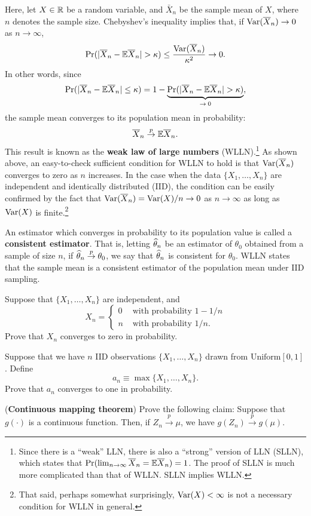 \documentclass[11pt, A4paper, openany, uplatex]{book}
\begin{document}
Here, let $X \in \mathbb{R}$ be a random variable, and $\bar X_n$ be the sample mean of $X$, where $n$ denotes the sample size.
Chebyshev's inequality implies that, if $\mathrm{Var}(\overline X_n) \to 0$ as $n \to \infty$,
\[
\Pr( |\overline X_n - \mathbb{E} \overline X_n | > \kappa ) \leq \frac{\mathrm{Var}(\overline X_n)}{\kappa^2} \to 0.
\]
In other words, since 
\[
	\Pr( |\overline X_n - \mathbb{E}\overline X_n | \le \kappa ) = 1 - \underbrace{\Pr( |\overline X_n - \mathbb{E}\overline X_n | > \kappa )}_{\to \: 0},
\]
the sample mean converges to its population mean in probability:
\[
\overline X_n \overset{p}{\to} \mathbb{E}\overline X_n.
\]
This result is known as the \textbf{weak law of large numbers} (WLLN).\footnote{	
	Since there is a ``weak'' LLN, there is also a ``strong'' version of LLN (SLLN), which states that $\Pr(\lim_{n \to \infty} \overline X_n = \mathbb{E} \overline X_n) = 1$.
	The proof of SLLN is much more complicated than that of WLLN.
	SLLN implies WLLN.}
As shown above, an easy-to-check sufficient condition for WLLN to hold is that $\mathrm{Var}(\overline X_n)$ converges to zero as $n$ increases.
In the case when the data $\{X_1, \ldots , X_n\}$ are independent and identically distributed (IID), the condition can be easily confirmed by the fact that $\mathrm{Var}(\overline X_n) = \mathrm{Var}(X)/n \to 0$ as $n \to \infty$ as long as $\mathrm{Var}(X)$ is finite.\footnote{
	That said, perhaps somewhat surprisingly, $\mathrm{Var}(X) < \infty$ is not a necessary condition for WLLN in general.
	}
\bigskip

An estimator which converges in probability to its population value is called a \textbf{consistent estimator}.
That is, letting $\widehat \theta_n$ be an estimator of $\theta_0$ obtained from a sample of size $n$, if $\widehat \theta_n \overset{p}{\to} \theta_0$, we say that $\widehat \theta_n$ is consistent for $\theta_0$.
WLLN states that the sample mean is a consistent estimator of the population mean under IID sampling.

\begin{framed}
\begin{exercise}\upshape
	Suppose that $\{X_1, \ldots, X_n\}$ are independent, and
	\[
	X_n = \left\{\begin{array}{ll}
	0 & \text{ with probability } 1-1/n\\
	n & \text{ with probability } 1/n.
	\end{array}\right.
	\]
	Prove that $X_n$ converges to zero in probability.
\end{exercise}
\begin{exercise}\upshape
	Suppose that we have $n$ IID observations $\{X_1, \ldots, X_n\}$ drawn from $\text{Uniform}[0,1]$.
	Define 
	\[
	a_n \equiv \max\{X_1, \ldots, X_n\}.
	\]
	Prove that $a_n$ converges to one in probability.
\end{exercise}
\begin{exercise}\upshape
	(\textbf{Continuous mapping theorem}) 
	Prove the following claim: Suppose that $g(\cdot)$ is a continuous function.
	Then, if $Z_n \overset{p}{\to} \mu$, we have $g(Z_n) \overset{p}{\to} g(\mu)$.
\end{exercise}
\end{framed}
\end{document}
